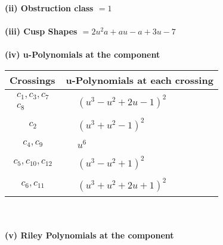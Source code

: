 \documentclass[1p]{elsarticle_modified}
\theoremstyle{definition}
\begin{document}
\flushleft \textbf{(ii) Obstruction class $= 1$}\\~\\
\flushleft \textbf{(iii) Cusp Shapes $= 2 u^2 a+a u- a+3 u-7$}\\~\\
\newpage\renewcommand{\arraystretch}{1}
\flushleft \textbf{(iv) u-Polynomials at the component}\newline \\
\begin{tabular}{m{50pt}|m{274pt}}
Crossings & \hspace{64pt}u-Polynomials at each crossing \\
\hline $$\begin{aligned}c_{1},c_{3},c_{7}\\c_{8}\end{aligned}$$&$\begin{aligned}
&(u^3- u^2+2 u-1)^2
\end{aligned}$\\
\hline $$\begin{aligned}c_{2}\end{aligned}$$&$\begin{aligned}
&(u^3+u^2-1)^2
\end{aligned}$\\
\hline $$\begin{aligned}c_{4},c_{9}\end{aligned}$$&$\begin{aligned}
&u^6
\end{aligned}$\\
\hline $$\begin{aligned}c_{5},c_{10},c_{12}\end{aligned}$$&$\begin{aligned}
&(u^3- u^2+1)^2
\end{aligned}$\\
\hline $$\begin{aligned}c_{6},c_{11}\end{aligned}$$&$\begin{aligned}
&(u^3+u^2+2 u+1)^2
\end{aligned}$\\
\hline
\end{tabular}\\~\\
\newpage\renewcommand{\arraystretch}{1}
\flushleft \textbf{(v) Riley Polynomials at the component}\newline \\
\end{document}

